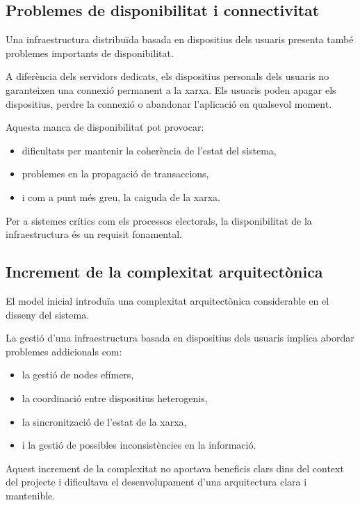 \documentclass[12pt,a4paper]{article}
\begin{document}
\subsection{Problemes de disponibilitat i connectivitat}

Una infraestructura distribuïda basada en dispositius dels usuaris presenta també problemes importants de disponibilitat.

A diferència dels servidors dedicats, els dispositius personals dels usuaris no garanteixen una connexió permanent a la xarxa. Els usuaris poden apagar els dispositius, perdre la connexió o abandonar l'aplicació en qualsevol moment.

Aquesta manca de disponibilitat pot provocar:

\begin{itemize}
\item dificultats per mantenir la coherència de l'estat del sistema,
\item problemes en la propagació de transaccions,
\item i com a punt més greu, la caiguda de la xarxa.
\end{itemize}

Per a sistemes crítics com els processos electorals, la disponibilitat de la infraestructura és un requisit fonamental.

\subsection{Increment de la complexitat arquitectònica}

El model inicial introduïa una complexitat arquitectònica considerable en el disseny del sistema.

La gestió d'una infraestructura basada en dispositius dels usuaris implica abordar problemes addicionals com:

\begin{itemize}
\item la gestió de nodes efímers,
\item la coordinació entre dispositius heterogenis,
\item la sincronització de l'estat de la xarxa,
\item i la gestió de possibles inconsistències en la informació.
\end{itemize}

Aquest increment de la complexitat no aportava beneficis clars dins del context del projecte i dificultava el desenvolupament d'una arquitectura clara i mantenible.
\end{document}
